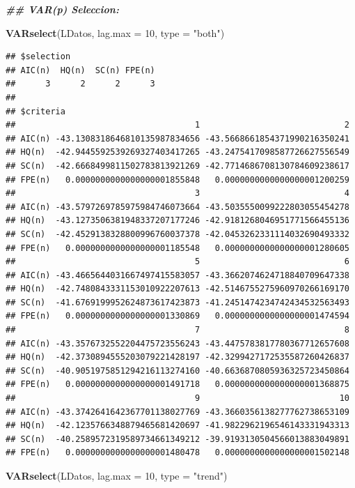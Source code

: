 \documentclass[
]{book}
\newenvironment{Shaded}{\begin{snugshade}}{\end{snugshade}}
\newcommand{\AttributeTok}[1]{\textcolor[rgb]{0.13,0.29,0.53}{#1}}
\newcommand{\DecValTok}[1]{\textcolor[rgb]{0.00,0.00,0.81}{#1}}
\newcommand{\DocumentationTok}[1]{\textcolor[rgb]{0.56,0.35,0.01}{\textbf{\textit{#1}}}}
\newcommand{\FunctionTok}[1]{\textcolor[rgb]{0.13,0.29,0.53}{\textbf{#1}}}
\newcommand{\NormalTok}[1]{#1}
\newcommand{\StringTok}[1]{\textcolor[rgb]{0.31,0.60,0.02}{#1}}
\begin{document}
\begin{Shaded}
\begin{Highlighting}[]
\DocumentationTok{\#\# VAR(p) Seleccion:}

\FunctionTok{VARselect}\NormalTok{(LDatos, }\AttributeTok{lag.max =} \DecValTok{10}\NormalTok{, }\AttributeTok{type =} \StringTok{"both"}\NormalTok{)}
\end{Highlighting}
\end{Shaded}

\begin{verbatim}
## $selection
## AIC(n)  HQ(n)  SC(n) FPE(n) 
##      3      2      2      3 
## 
## $criteria
##                                    1                             2
## AIC(n) -43.1308318646810135987834656 -43.5668661854371990216350241
## HQ(n)  -42.9445592539269327403417265 -43.2475417098587726627556549
## SC(n)  -42.6668499811502783813921269 -42.7714686708130784609238617
## FPE(n)   0.0000000000000000001855848   0.0000000000000000001200259
##                                    3                             4
## AIC(n) -43.5797269785975984746073664 -43.5035550099222803055454278
## HQ(n)  -43.1273506381948337207177246 -42.9181268046951771566455136
## SC(n)  -42.4529138328800996760037378 -42.0453262331114032690493332
## FPE(n)   0.0000000000000000001185548   0.0000000000000000001280605
##                                    5                             6
## AIC(n) -43.4665644031667497415583057 -43.3662074624718840709647338
## HQ(n)  -42.7480843331153010922207613 -42.5146755275960970266169170
## SC(n)  -41.6769199952624873617423873 -41.2451474234742434532563493
## FPE(n)   0.0000000000000000001330869   0.0000000000000000001474594
##                                    7                             8
## AIC(n) -43.3576732552204475723556243 -43.4475783817780367712657608
## HQ(n)  -42.3730894555203079221428197 -42.3299427172535587260426837
## SC(n)  -40.9051975851294216113274160 -40.6636870805936325723450864
## FPE(n)   0.0000000000000000001491718   0.0000000000000000001368875
##                                    9                            10
## AIC(n) -43.3742641642367701138027769 -43.3660356138277762738653109
## HQ(n)  -42.1235766348879465681420697 -41.9822962196546143331943313
## SC(n)  -40.2589572319589734661349212 -39.9193130504566013883049891
## FPE(n)   0.0000000000000000001480478   0.0000000000000000001502148
\end{verbatim}

\begin{Shaded}
\begin{Highlighting}[]
\FunctionTok{VARselect}\NormalTok{(LDatos, }\AttributeTok{lag.max =} \DecValTok{10}\NormalTok{, }\AttributeTok{type =} \StringTok{"trend"}\NormalTok{)}
\end{Highlighting}
\end{Shaded}
\end{document}
